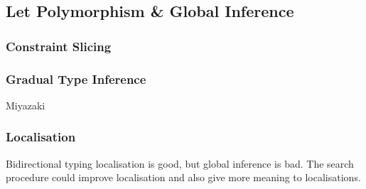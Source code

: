 \subsection{Let Polymorphism \& Global Inference}
\subsubsection{Constraint Slicing}
\subsubsection{Gradual Type Inference}
Miyazaki
\subsubsection{Localisation}
Bidirectional typing localisation is good, but global inference is bad. The search procedure could improve localisation and also give more meaning to localisations.